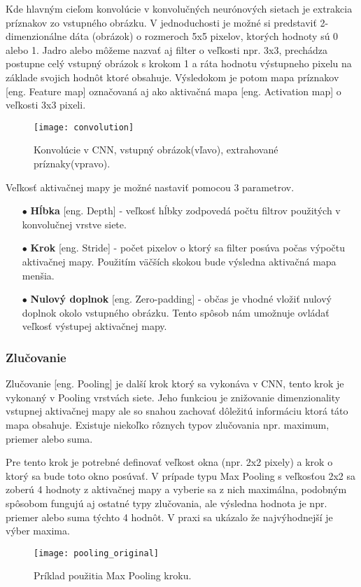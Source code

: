 Kde hlavným cieľom konvolúcie v konvolučných neurónových sietach je extrakcia príznakov zo vstupného obrázku.
V jednoduchosti je možné si predstaviť 2-dimenzionálne dáta (obrázok) o rozmeroch 5x5 pixelov, ktorých hodnoty sú 0 alebo 1.
Jadro alebo môžeme nazvať aj filter o veľkosti npr. 3x3, prechádza postupne celý vstupný obrázok s krokom 1 a ráta hodnotu výstupneho pixelu na základe svojich hodnôt ktoré obsahuje.
Výsledokom je potom mapa príznakov [eng. Feature map] označovaná aj ako aktivačná mapa [eng. Activation map] o veľkosti 3x3 pixeli\cite{odkaz:CNNArticle}.
\begin{figure}[H]
    \centering
    \texttt{[image: convolution]}
    \caption{Konvolúcie v CNN, vstupný obrázok(vľavo), extrahované príznaky(vpravo)\cite{odkaz:CNNArticle}.}
    \label{pic:Convolution}
\end{figure}

Veľkosť aktivačnej mapy je možné nastaviť pomocou 3 parametrov.
\begin{enumerate}
    \item[$\bullet$] \textbf{Hĺbka} [eng. Depth] - veľkosť hĺbky zodpovedá počtu filtrov použitých v konvolučnej vrstve siete.
    \item[$\bullet$] \textbf{Krok} [eng. Stride] - počet pixelov o ktorý sa filter posúva počas výpočtu aktivačnej mapy.
    Použitím väčších skokou bude výsledna aktivačná mapa menšia.
    \item[$\bullet$] \textbf{Nulový doplnok} [eng. Zero-padding] - občas je vhodné vložiť nulový doplnok okolo vstupného obrázku.
    Tento spôsob nám umožnuje ovládať veľkosť výstupej aktivačnej mapy.
\end{enumerate}


\subsubsection{Zlučovanie}
Zlučovanie [eng. Pooling] je další krok ktorý sa vykonáva v CNN, tento krok je vykonaný v Pooling vrstvách siete.
Jeho funkciou je znižovanie dimenzionality vstupnej aktivačnej mapy ale so snahou zachovať dôležitú informáciu ktorá táto mapa obsahuje.
Existuje niekoľko rôznych typov zlučovania npr. maximum, priemer alebo suma.

Pre tento krok je potrebné definovať veľkost okna (npr. 2x2 pixely) a krok o ktorý sa bude toto okno posúvať.
V prípade typu Max Pooling s veľkosťou 2x2 sa zoberú 4 hodnoty z aktivačnej mapy a vyberie sa z nich maximálna, podobným spôsobom
    fungujú aj ostatné typy zlučovania, ale výsledna hodnota je npr. priemer alebo suma týchto 4 hodnôt.
V praxi sa ukázalo že najvýhodnejší je výber maxima\cite{odkaz:CNNArticle}.
\begin{figure}[H]
    \centering
    \texttt{[image: pooling\_original]}
    \caption{Príklad použitia Max Pooling kroku\cite{odkaz:CNNArticle}.}
    \label{pic:Convolution}
\end{figure}



